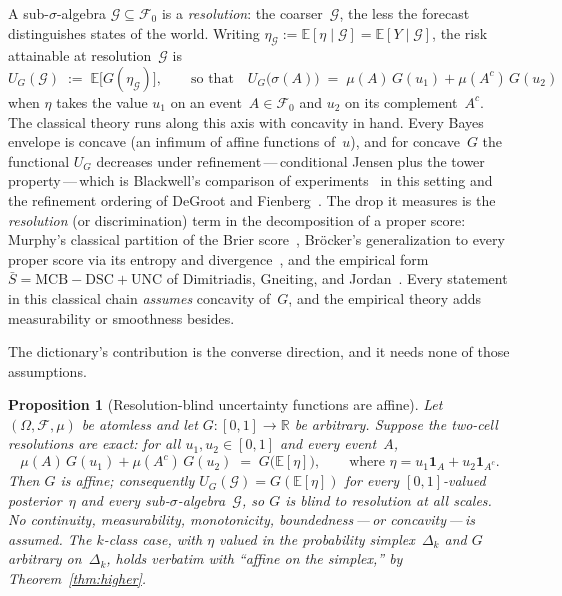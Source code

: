 \documentclass{article}
\theoremstyle{plain}
\newtheorem{proposition}[theorem]{Proposition}
\theoremstyle{definition}
\newcommand{\R}{\mathbb{R}}
\newcommand{\E}{\mathbb{E}}
\begin{document}
A sub-$\sigma$-algebra $\mathcal{G}\subseteq\mathcal{F}_0$ is a
\emph{resolution}: the coarser~$\mathcal{G}$, the less the forecast
distinguishes states of the world. Writing
$\eta_{\mathcal{G}}:=\E[\eta\mid\mathcal{G}] = \E[Y\mid\mathcal{G}]$, the risk attainable at
resolution~$\mathcal{G}$ is
\[
U_G(\mathcal{G})\;:=\;\E\bigl[G(\eta_{\mathcal{G}})\bigr],
\qquad\text{so that}\quad
U_G\bigl(\sigma(A)\bigr)\;=\;\mu(A)\,G(u_1)+\mu(A^{c})\,G(u_2)
\]
when $\eta$ takes the value $u_1$ on an event~$A\in\mathcal{F}_0$ and $u_2$ on its complement~$A^{c}$.
The classical theory runs along this axis with concavity in hand.
Every Bayes envelope is concave (an infimum of affine functions
of~$u$), and for concave~$G$ the functional $U_G$ decreases under
refinement\,---\,conditional Jensen plus the tower
property\,---\,which is Blackwell's comparison of
experiments~\cite{Blackwell1953} in this setting and the refinement
ordering of DeGroot and Fienberg~\cite{DeGrootFienberg1983}. The drop
it measures is the \emph{resolution} (or discrimination) term in the
decomposition of a proper score: Murphy's classical partition of the
Brier score~\cite{Murphy1973}, Br\"ocker's generalization to every
proper score via its entropy and divergence~\cite{Brocker2009}, and
the empirical form
$\bar S=\mathrm{MCB}-\mathrm{DSC}+\mathrm{UNC}$ of Dimitriadis,
Gneiting, and Jordan~\cite{DGJ2021}. Every statement in this
classical chain \emph{assumes} concavity of~$G$, and the empirical
theory adds measurability or smoothness besides.

The dictionary's contribution is the converse direction, and it needs
none of those assumptions.

\begin{proposition}[Resolution-blind uncertainty functions are affine]
\label{prop:resolution}
Let $(\Omega,\mathcal{F},\mu)$ be atomless and let
$G\colon[0,1]\to\R$ be arbitrary. Suppose the two-cell resolutions
are exact: for all $u_1,u_2\in[0,1]$ and every event~$A$,
\[
\mu(A)\,G(u_1)+\mu(A^{c})\,G(u_2)\;=\;G\bigl(\E[\eta]\bigr),
\qquad\text{where } \eta=u_1\mathbf{1}_A+u_2\mathbf{1}_{A^{c}}.
\]
Then $G$ is affine; consequently $U_G(\mathcal{G})=G(\E[\eta])$ for
\emph{every} $[0,1]$-valued posterior~$\eta$ and \emph{every}
sub-$\sigma$-algebra~$\mathcal{G}$, so $G$ is blind to resolution at
all scales. No continuity, measurability, monotonicity,
boundedness\,---\,or concavity\,---\,is assumed. The $k$-class case,
with $\eta$ valued in the probability simplex~$\Delta_k$ and $G$
arbitrary on~$\Delta_k$, holds verbatim with ``affine on the
simplex,'' by Theorem~\ref{thm:higher}.
\end{proposition}
\end{document}
